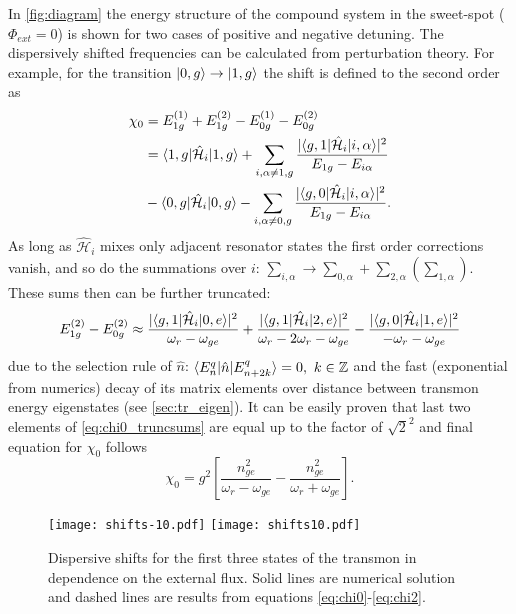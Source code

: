 \documentclass[12pt, twoside]{report}
\DeclarePairedDelimiter\bra{\langle}{\rvert}
\DeclarePairedDelimiter\ket{\lvert}{\rangle}
\newcommand{\sbrkt}[1]{\left[ #1 \right]}
\numberwithin{equation}{section}
\begin{document}
In \autoref{fig:diagram} the energy structure of the compound system in the sweet-spot ($\Phi_{ext}=0$) is shown for two cases of positive and negative detuning. The dispersively shifted frequencies can be calculated from perturbation theory. For example, for the transition $\ket{0, g}\rightarrow \ket{1, g}$ the shift is defined to the second order as
\begin{align*}
\chi_0 &=  E_{1g}^{(1)} + E_{1g}^{(2)} - E_{0g}^{(1)} - E_{0g}^{(2)}\\
 &= \bra{1, g}\mathcal{\hat H}_i\ket{1,g} + \sum_{i, \alpha \neq 1, g} \frac{|\bra{g, 1}\mathcal{\hat H}_i\ket{i,\alpha} |^2}{E_{1g} - E_{i\alpha}}\\
 & - \bra{0, g}\mathcal{\hat H}_i\ket{0,g} - \sum_{i, \alpha \neq 0, g} \frac{|\bra{g, 0}\mathcal{\hat H}_i\ket{i,\alpha} |^2}{E_{1g} - E_{i\alpha}}.
\end{align*}
As long as $\mathcal{\hat H}_i$ mixes only adjacent resonator states the first order corrections vanish, and so do the summations over $i$: $\sum_{i, \alpha} \rightarrow \sum_{0,\alpha} + \sum_{2,\alpha} (\sum_{1,\alpha})$. These sums then can be further truncated:
\begin{equation}
E_{1g}^{(2)} - E_{0g}^{(2)} \approx \frac{|\bra{g,1}\mathcal{\hat H}_i\ket{0,e}|^2}{\omega_r - \omega_{ge}} + \frac{|\bra{g,1}\mathcal{\hat H}_i\ket{2,e}|^2}{\omega_r - 2\omega_r - \omega_{ge}} -
\frac{|\bra{g,0}\mathcal{\hat H}_i\ket{1,e}|^2}{-\omega_r - \omega_{ge}}\label{eq:chi0_truncsums}
\end{equation} 
due to the selection rule of $\hat n$: $\bra{E^q_n}\hat n \ket{E^q_{n+2k}} = 0,\ k \in \mathbb{Z}$ and the fast (exponential from numerics) decay of its matrix elements over distance between transmon energy eigenstates (see \autoref{sec:tr_eigen}). It can be easily proven that last two elements of \eqref{eq:chi0_truncsums} are equal up to the factor of $\sqrt{2}^2$ and final equation for $\chi_0$ follows
\begin{equation}
\chi_0 = g^2\sbrkt{\frac{n_{ge}^2}{\omega_r - \omega_{ge}}-\frac{n_{ge}^2}{\omega_r + \omega_{ge}}}.
\label{eq:chi0}
\end{equation}

\begin{figure}[h!]
\centering
\texttt{[image: shifts-10.pdf]}
\texttt{[image: shifts10.pdf]}
\caption{Dispersive shifts for the first three states of the transmon in dependence on the external flux. Solid lines are numerical solution and dashed lines are results from equations \eqref{eq:chi0}-\eqref{eq:chi2}.}
\label{fig:disp_shifts}
\end{figure}
\end{document}
